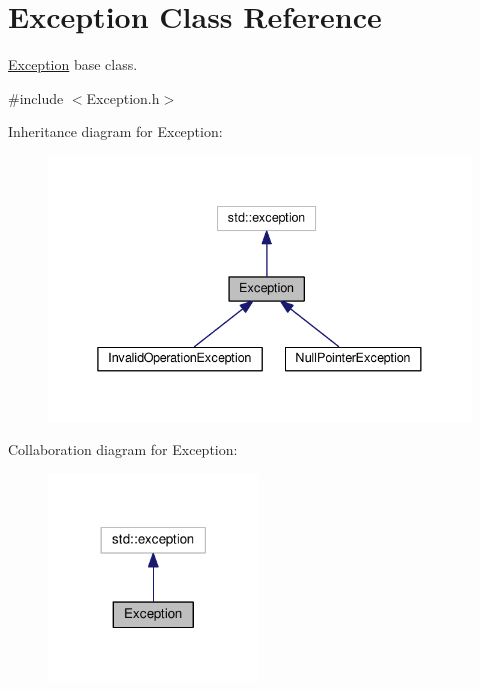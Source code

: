 \hypertarget{classException}{}\section{Exception Class Reference}
\label{classException}


\hyperlink{classException}{Exception} base class.  




{\ttfamily \#include $<$Exception.\+h$>$}



Inheritance diagram for Exception\+:\nopagebreak
\begin{figure}[H]
\begin{center}
\leavevmode
\includegraphics[width=338pt]{classException__inherit__graph}
\end{center}
\end{figure}


Collaboration diagram for Exception\+:\nopagebreak
\begin{figure}[H]
\begin{center}
\leavevmode
\includegraphics[width=158pt]{classException__coll__graph}
\end{center}
\end{figure}

